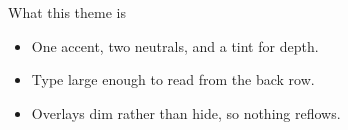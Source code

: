 \documentclass[aspectratio=169]{slides}
\begin{document}
\begin{frame}{What this theme is}
  \begin{itemize}
    \item<1-> One accent, two neutrals, and a tint for depth.
    \item<2-> Type large enough to read from the back row.
    \item<3-> Overlays dim rather than hide, so nothing reflows.
  \end{itemize}
\end{frame}
\end{document}

